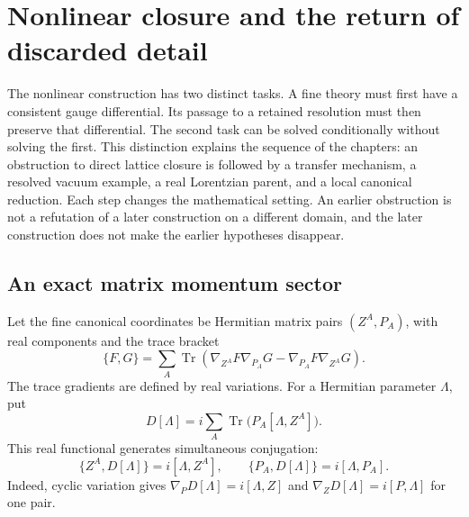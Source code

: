 \section{Nonlinear closure and the return of discarded detail}
\label{c:constraints:transfer}

The nonlinear construction has two distinct tasks. A fine theory must first have a consistent gauge differential. Its passage to a retained resolution must then preserve that differential. The second task can be solved conditionally without solving the first. This distinction explains the sequence of the chapters: an obstruction to direct lattice closure is followed by a transfer mechanism, a resolved vacuum example, a real Lorentzian parent, and a local canonical reduction. Each step changes the mathematical setting. An earlier obstruction is not a refutation of a later construction on a different domain, and the later construction does not make the earlier hypotheses disappear.

\subsection{An exact matrix momentum sector}
Let the fine canonical coordinates be Hermitian matrix pairs $(Z^A,P_A)$, with real components and the trace bracket
\begin{equation}
 \{F,G\}=\sum_A\operatorname{Tr}\left(
 \nabla_{Z^A}F\nabla_{P_A}G-
 \nabla_{P_A}F\nabla_{Z^A}G\right).
 \label{c:constraints:trace-bracket}
\end{equation}
The trace gradients are defined by real variations. For a Hermitian parameter $\Lambda$, put
\begin{equation}
 D[\Lambda]=i\sum_A\operatorname{Tr}\bigl(P_A[\Lambda,Z^A]\bigr).
\end{equation}
This real functional generates simultaneous conjugation:
\begin{equation}
 \{Z^A,D[\Lambda]\}=i[\Lambda,Z^A],\qquad
 \{P_A,D[\Lambda]\}=i[\Lambda,P_A].
\end{equation}
Indeed, cyclic variation gives
$\nabla_PD[\Lambda]=i[\Lambda,Z]$ and
$\nabla_ZD[\Lambda]=i[P,\Lambda]$ for one pair.

